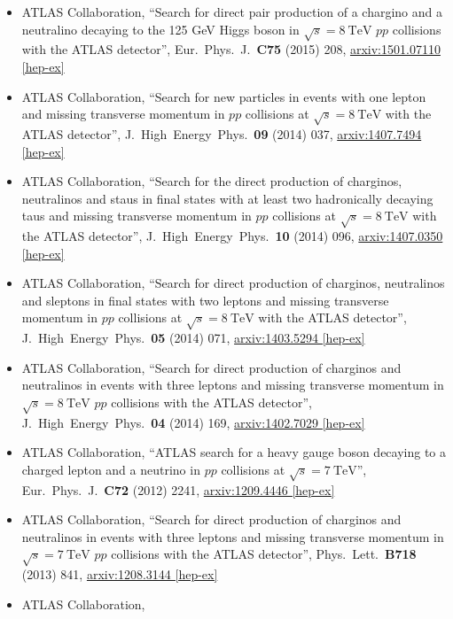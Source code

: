 \documentclass[a4paper,10pt]{article}
\begin{document}
\begin{itemize}
	\item ATLAS Collaboration,
	``Search for direct pair production of a chargino and a neutralino decaying to the 125 GeV Higgs boson in $\sqrt{s} = 8\ \mathrm{TeV}$ $pp$ collisions with the ATLAS detector'',
	Eur.\ Phys.\ J.\ {\bf C75} (2015) 208,
	\href{http://arxiv.org/abs/1501.07110}{arxiv:1501.07110 [hep-ex]}
	\item ATLAS Collaboration,
	``Search for new particles in events with one lepton and missing transverse momentum in $pp$ collisions at $\sqrt{s} = 8\ \mathrm{TeV}$ with the ATLAS detector'',
	J.\ High\ Energy\ Phys.\ {\bf 09} (2014) 037,
	\href{http://arxiv.org/abs/1407.7494}{arxiv:1407.7494 [hep-ex]}
	\item ATLAS Collaboration, 
	``Search for the direct production of charginos, neutralinos and staus in final states with at least two hadronically decaying taus and missing transverse momentum in $pp$ collisions at $\sqrt{s} = 8\ \mathrm{TeV}$ with the ATLAS detector'',
	J.\ High\ Energy\ Phys.\ {\bf 10} (2014) 096,
	\href{http://arxiv.org/abs/1407.0350}{arxiv:1407.0350 [hep-ex]}
	\item ATLAS Collaboration, 
	``Search for direct production of charginos, neutralinos and sleptons in final states with two leptons and missing transverse momentum in $pp$ collisions at 
	$\sqrt{s} = 8\ \mathrm{TeV}$ with the ATLAS detector'', 
	J.\ High\ Energy\ Phys.\ {\bf 05} (2014) 071, 
	\href{http://arxiv.org/abs/1403.5294}{arxiv:1403.5294 [hep-ex]}
	\item ATLAS Collaboration, 
	``Search for direct production of charginos and neutralinos in events with three leptons and missing transverse momentum in $\sqrt{s} = 8\ \mathrm{TeV}$ $pp$ collisions with the ATLAS detector'',
	J.\ High\ Energy\ Phys.\ {\bf 04} (2014) 169,
	\href{http://arxiv.org/abs/1402.7029}{arxiv:1402.7029 [hep-ex]}
	\item ATLAS Collaboration,
	``ATLAS search for a heavy gauge boson decaying to a charged lepton and a neutrino in $pp$ collisions at $\sqrt{s} = 7\ \mathrm{TeV}$'',
	Eur.\ Phys.\ J.\ {\bf C72} (2012) 2241,
	\href{http://arxiv.org/abs/1209.4446}{arxiv:1209.4446 [hep-ex]}
	\item ATLAS Collaboration,
	``Search for direct production of charginos and neutralinos in events with three leptons and missing transverse momentum in $\sqrt{s} = 7\ \mathrm{TeV}$ $pp$ collisions with the ATLAS detector'', 
	Phys.\ Lett.\ {\bf B718} (2013) 841, 
	\href{http://arxiv.org/abs/1208.3144}{arxiv:1208.3144 [hep-ex]}
	\item ATLAS Collaboration,

\end{itemize}
\end{document}

